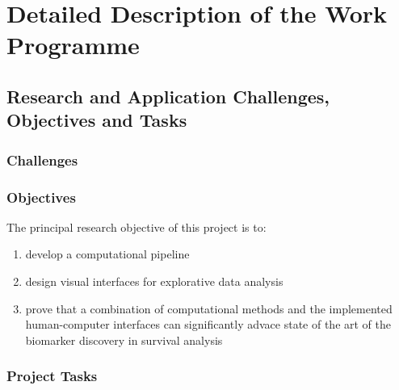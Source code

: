 \documentclass[11pt,a4paper]{article}
\begin{document}
\section{Detailed Description of the Work Programme}

\subsection{Research and Application Challenges, Objectives and Tasks}

\subsubsection{Challenges}

\subsubsection{Objectives}
The principal research objective of this project is to:
\begin{enumerate}
	\item develop a computational pipeline
	\item design visual interfaces for explorative data analysis
	\item prove that a combination of computational methods and the implemented human-computer interfaces can significantly advace state of the art of the biomarker discovery in survival analysis
\end{enumerate}

\subsubsection{Project Tasks}
\end{document}

